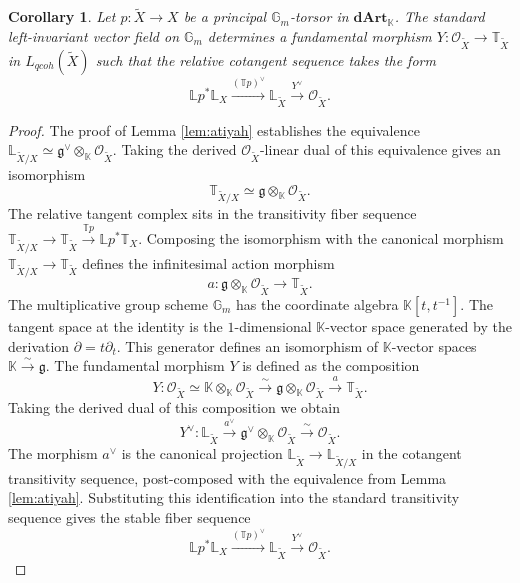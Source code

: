 \documentclass[reqno]{amsart}
\newtheorem{corollary}[theorem]{Corollary}
\theoremstyle{definition}
\theoremstyle{remark}
\newcommand{\LL}{\mathbb{L}}
\newcommand{\TT}{\mathbb{T}}
\newcommand{\Gm}{\mathbb{G}_m}
\newcommand{\cO}{\mathcal{O}}
\newcommand{\K}{\mathbb{K}}
\newcommand{\dArt}{\mathbf{dArt}}
\begin{document}
{\begin{corollary} \label{cor:fundamental_morphism}
  Let $p \colon \widetilde{X} \to X$ be a principal $\Gm$-torsor in $\dArt_\K$. The standard left-invariant vector field on $\Gm$ determines a fundamental morphism $Y \colon \cO_{\widetilde{X}} \to \TT_{\widetilde{X}}$ in $L_{qcoh}(\widetilde{X})$ such that the relative cotangent sequence takes the form
  \begin{equation*}
    \LL p^* \LL_X \xrightarrow{(\TT p)^\vee} \LL_{\widetilde{X}} \xrightarrow{Y^\vee} \cO_{\widetilde{X}}.
  \end{equation*}
\end{corollary}
\begin{proof}
  The proof of Lemma \ref{lem:atiyah} establishes the equivalence $\LL_{\widetilde{X}/X} \simeq \mathfrak{g}^\vee \otimes_\K \cO_{\widetilde{X}}$. Taking the derived $\cO_{\widetilde{X}}$-linear dual of this equivalence gives an isomorphism
  \begin{equation*}
    \TT_{\widetilde{X}/X} \simeq \mathfrak{g} \otimes_\K \cO_{\widetilde{X}}.
  \end{equation*}
  The relative tangent complex sits in the transitivity fiber sequence $\TT_{\widetilde{X}/X} \to \TT_{\widetilde{X}} \xrightarrow{\TT p} \LL p^* \TT_X$. Composing the isomorphism with the canonical morphism $\TT_{\widetilde{X}/X} \to \TT_{\widetilde{X}}$ defines the infinitesimal action morphism
  \begin{equation*}
    a \colon \mathfrak{g} \otimes_\K \cO_{\widetilde{X}} \to \TT_{\widetilde{X}}.
  \end{equation*}
  The multiplicative group scheme $\Gm$ has the coordinate algebra $\K[t, t^{-1}]$. The tangent space at the identity is the $1$-dimensional $\K$-vector space generated by the derivation $\partial = t \partial_t$. This generator defines an isomorphism of $\K$-vector spaces $\K \xrightarrow{\sim} \mathfrak{g}$. The fundamental morphism $Y$ is defined as the composition
  \begin{equation*}
    Y \colon \cO_{\widetilde{X}} \simeq \K \otimes_\K \cO_{\widetilde{X}} \xrightarrow{\sim} \mathfrak{g} \otimes_\K \cO_{\widetilde{X}} \xrightarrow{a} \TT_{\widetilde{X}}.
  \end{equation*}
  Taking the derived dual of this composition we obtain
  \begin{equation*}
    Y^\vee \colon \LL_{\widetilde{X}} \xrightarrow{a^\vee} \mathfrak{g}^\vee \otimes_\K \cO_{\widetilde{X}} \xrightarrow{\sim} \cO_{\widetilde{X}}.
  \end{equation*}
  The morphism $a^\vee$ is the canonical projection $\LL_{\widetilde{X}} \to \LL_{\widetilde{X}/X}$ in the cotangent transitivity sequence, post-composed with the equivalence from Lemma \ref{lem:atiyah}. Substituting this identification into the standard transitivity sequence gives the stable fiber sequence
  \begin{equation*}
    \LL p^* \LL_X \xrightarrow{(\TT p)^\vee} \LL_{\widetilde{X}} \xrightarrow{Y^\vee} \cO_{\widetilde{X}}.
  \end{equation*}
\end{proof}

}
\end{document}
